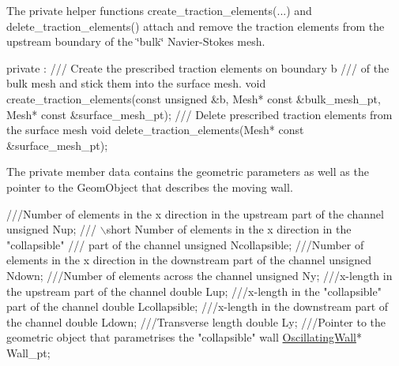 The private helper functions {\ttfamily create\+\_\+traction\+\_\+elements}(...) and {\ttfamily delete\+\_\+traction\+\_\+elements()} attach and remove the traction elements from the upstream boundary of the \char`\"{}bulk\char`\"{} Navier-\/\+Stokes mesh. 
\begin{DoxyCodeInclude}
 
private : 
\textcolor{comment}{}
\textcolor{comment}{ /// Create the prescribed traction elements on boundary b}
\textcolor{comment}{ /// of the bulk mesh and stick them into the surface mesh.}
\textcolor{comment}{} \textcolor{keywordtype}{void} create\_traction\_elements(\textcolor{keyword}{const} \textcolor{keywordtype}{unsigned} &b, 
                               Mesh* \textcolor{keyword}{const} &bulk\_mesh\_pt,
                               Mesh* \textcolor{keyword}{const} &surface\_mesh\_pt);
 \textcolor{comment}{}
\textcolor{comment}{ /// Delete prescribed traction elements from the surface mesh}
\textcolor{comment}{} \textcolor{keywordtype}{void} delete\_traction\_elements(Mesh* \textcolor{keyword}{const} &surface\_mesh\_pt);

\end{DoxyCodeInclude}


The private member data contains the geometric parameters as well as the pointer to the {\ttfamily Geom\+Object} that describes the moving wall.


\begin{DoxyCodeInclude}
\textcolor{comment}{}
\textcolor{comment}{ ///Number of elements in the x direction in the upstream part of the channel}
\textcolor{comment}{} \textcolor{keywordtype}{unsigned} Nup;
\textcolor{comment}{}
\textcolor{comment}{ /// \(\backslash\)short Number of elements in the x direction in the "collapsible" }
\textcolor{comment}{ /// part of the channel}
\textcolor{comment}{} \textcolor{keywordtype}{unsigned} Ncollapsible;
\textcolor{comment}{}
\textcolor{comment}{ ///Number of elements in the x direction in the downstream part of the channel}
\textcolor{comment}{} \textcolor{keywordtype}{unsigned} Ndown;
\textcolor{comment}{}
\textcolor{comment}{ ///Number of elements across the channel}
\textcolor{comment}{} \textcolor{keywordtype}{unsigned} Ny;
\textcolor{comment}{}
\textcolor{comment}{ ///x-length in the upstream part of the channel}
\textcolor{comment}{} \textcolor{keywordtype}{double} Lup;
\textcolor{comment}{}
\textcolor{comment}{ ///x-length in the "collapsible" part of the channel}
\textcolor{comment}{} \textcolor{keywordtype}{double} Lcollapsible;
\textcolor{comment}{}
\textcolor{comment}{ ///x-length in the downstream part of the channel}
\textcolor{comment}{} \textcolor{keywordtype}{double} Ldown;
\textcolor{comment}{}
\textcolor{comment}{ ///Transverse length}
\textcolor{comment}{} \textcolor{keywordtype}{double} Ly;
\textcolor{comment}{}
\textcolor{comment}{ ///Pointer to the geometric object that parametrises the "collapsible" wall}
\textcolor{comment}{} \hyperlink{classOscillatingWall}{OscillatingWall}* Wall\_pt;

\end{DoxyCodeInclude}


